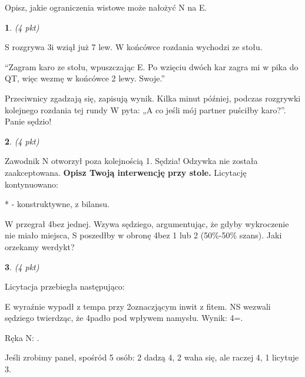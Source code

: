 \documentclass[12pt, a4paper]{article}
\newtheorem{pyt}{}
\begin{document}

Opisz, jakie ograniczenia wistowe może nałożyć N na E.
\pagebreak


\begin{pyt} (4 pkt)
\end{pyt}

S rozgrywa 3\nt i wziął już 7 lew. W końcówce rozdania wychodzi ze stołu.


``Zagram karo ze stołu, wpuszczając E. Po wzięciu dwóch kar zagra mi w pika do QT, więc wezmę
w końcówce 2 lewy. Swoje.''

Przeciwnicy zgadzają się, zapisują wynik. Kilka minut później, podczas
rozgrywki kolejnego rozdania tej rundy W pyta: „A co jeśli mój partner puściłby karo?”. Panie sędzio!


\begin{pyt} (4 pkt) \end{pyt}
Zawodnik N otworzył poza kolejnością 1\spades. Sędzia! Odzywka
nie została zaakceptowana. \textbf{Opisz Twoją interwencję przy stole.} Licytację kontynuowano: 


* - konstruktywne, z bilansu.

W przegrał 4\hearts bez jednej. Wzywa sędziego, argumentując, że gdyby wykroczenie nie miało miejsca, S poszedłby w obronę 4\spades\dbl bez 1 lub 2 (50\%-50\% szans).
Jaki orzekamy werdykt?

\begin{pyt} (4 pkt) \end{pyt}
Licytacja przebiegła następująco:

E wyraźnie wypadł z tempa przy 2\nt oznaczjącym inwit z fitem. NS wezwali sędziego twierdząc, że 4\hearts padło pod wpływem namysłu. Wynik: 4\xhearts=.

Ręka N: .

Jeśli zrobimy panel, spośród 5 osób: 2 dadzą 4\hearts, 2 waha się, ale raczej 4\hearts, 1 licytuje 3\hearts.
\end{document}
